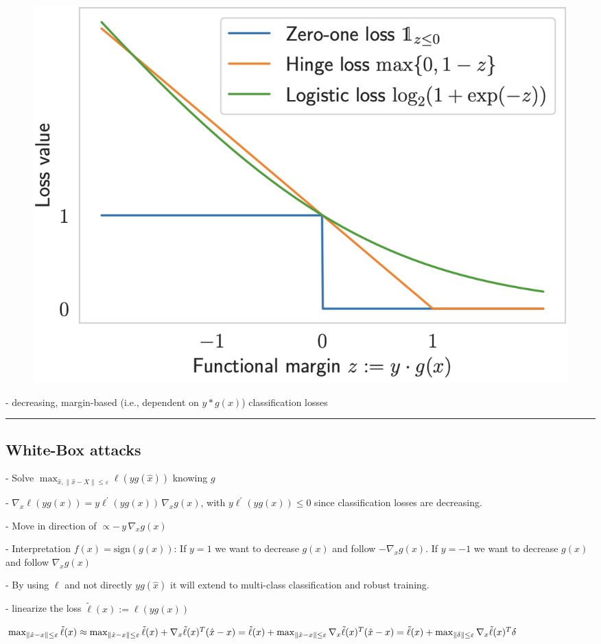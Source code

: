 \begin{figure} 
    \centering
    \includegraphics[width=0.5\columnwidth]{figures/classification_losses.png}
\end{figure}
- decreasing, margin-based (i.e., dependent on $y * g(x)$) classification losses

\vspace{4pt}
\hrule
\vspace{4pt}
\subsection{White-Box attacks}

- Solve $\operatorname*{max}_{\hat{x},\|\hat{x}-X\|\leq\varepsilon}\ell(yg(\hat{x}))$ knowing $g$

- $\nabla_{x}{\ell}(y g(x))=y\ell^{\prime}(y g(x))\,\nabla_{x}g(x)$, with $y\ell^{\prime}(y g(x)) \leq 0$ since classification losses are decreasing.

- Move in direction of $\propto-\,y\,\nabla_{x}g(x)$

- Interpretation $f(x)=\mathrm{{sign}}(g(x))$: If $y=1$ we want to decrease $g(x)$ and follow $-\nabla_{x}g(x)$. If $y=-1$ we want to decrease $g(x)$ and follow $\nabla_{x}g(x)$

- By using $\ell$ and not directly $yg(\hat{x})$ it will extend to multi-class classification and robust training.

- linearize the loss $\tilde{\ell}(x):={\ell}(y g(x))$

$\operatorname*{max}_{\|{\hat{x}}-x\|\leq\varepsilon}{\tilde{\ell}}(x)\\\approx\operatorname*{max}_{\|{\hat{x}}-x\|\leq\varepsilon}{\tilde{\ell}}(x)+\nabla_{x}{\tilde{\ell}}(x)^{T}({\hat{x}}-x) \\={\tilde{\ell}}(x)+\operatorname*{max}_{\|{\hat{x}}-x\|\leq\varepsilon}{\nabla}_{x}{\tilde{\ell}}(x)^{T}({\hat{x}}-x) \\={\tilde{\ell}}(x)+\operatorname*{max}_{\|\delta\|\leq\varepsilon}{\nabla}_{x}{\tilde{\ell}}(x)^{T}{\delta}$

